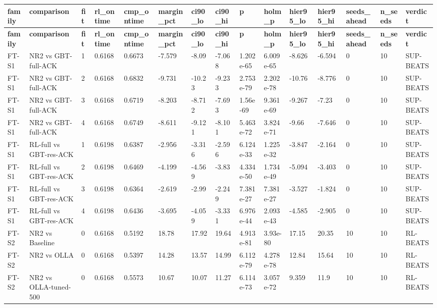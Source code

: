 \documentclass[10pt]{article}
\begin{document}
\begin{landscape}
\begin{longtable}{@{}lllllllllllllll@{}}
\toprule
\textbf{family} & \textbf{comparison} & \textbf{fit} & \textbf{rl\_ontime} & \textbf{cmp\_ontime} & \textbf{margin\_pct} & \textbf{ci90\_lo} & \textbf{ci90\_hi} & \textbf{p} & \textbf{holm\_p} & \textbf{hier95\_lo} & \textbf{hier95\_hi} & \textbf{seeds\_ahead} & \textbf{n\_seeds} & \textbf{verdict} \\
\midrule
\endfirsthead
\toprule
\textbf{family} & \textbf{comparison} & \textbf{fit} & \textbf{rl\_ontime} & \textbf{cmp\_ontime} & \textbf{margin\_pct} & \textbf{ci90\_lo} & \textbf{ci90\_hi} & \textbf{p} & \textbf{holm\_p} & \textbf{hier95\_lo} & \textbf{hier95\_hi} & \textbf{seeds\_ahead} & \textbf{n\_seeds} & \textbf{verdict} \\
\midrule
\endhead
FT-S1 & NR2 vs GBT-full-ACK & 1 & 0.6168 & 0.6673 & -7.579 & -8.09 & -7.068 & 1.202e-65 & 6.009e-65 & -8.626 & -6.594 & 0 & 10 & SUP-BEATS \\
FT-S1 & NR2 vs GBT-full-ACK & 2 & 0.6168 & 0.6832 & -9.731 & -10.23 & -9.233 & 2.753e-79 & 2.202e-78 & -10.76 & -8.776 & 0 & 10 & SUP-BEATS \\
FT-S1 & NR2 vs GBT-full-ACK & 3 & 0.6168 & 0.6719 & -8.203 & -8.712 & -7.693 & 1.56e-69 & 9.361e-69 & -9.267 & -7.23 & 0 & 10 & SUP-BEATS \\
FT-S1 & NR2 vs GBT-full-ACK & 4 & 0.6168 & 0.6749 & -8.611 & -9.121 & -8.101 & 5.463e-72 & 3.824e-71 & -9.66 & -7.646 & 0 & 10 & SUP-BEATS \\
FT-S1 & RL-full vs GBT-res-ACK & 1 & 0.6198 & 0.6387 & -2.956 & -3.316 & -2.596 & 6.124e-33 & 1.225e-32 & -3.847 & -2.164 & 0 & 10 & SUP-BEATS \\
FT-S1 & RL-full vs GBT-res-ACK & 2 & 0.6198 & 0.6469 & -4.199 & -4.569 & -3.83 & 4.334e-50 & 1.734e-49 & -5.094 & -3.403 & 0 & 10 & SUP-BEATS \\
FT-S1 & RL-full vs GBT-res-ACK & 3 & 0.6198 & 0.6364 & -2.619 & -2.99 & -2.249 & 7.381e-27 & 7.381e-27 & -3.527 & -1.824 & 0 & 10 & SUP-BEATS \\
FT-S1 & RL-full vs GBT-res-ACK & 4 & 0.6198 & 0.6436 & -3.695 & -4.059 & -3.331 & 6.976e-44 & 2.093e-43 & -4.585 & -2.905 & 0 & 10 & SUP-BEATS \\
FT-S2 & NR2 vs Baseline & 0 & 0.6168 & 0.5192 & 18.78 & 17.92 & 19.64 & 4.913e-81 & 3.93e-80 & 17.15 & 20.35 & 10 & 10 & RL-BEATS \\
FT-S2 & NR2 vs OLLA & 0 & 0.6168 & 0.5397 & 14.28 & 13.57 & 14.99 & 6.112e-79 & 4.278e-78 & 12.84 & 15.64 & 10 & 10 & RL-BEATS \\
FT-S2 & NR2 vs OLLA-tuned-500 & 0 & 0.6168 & 0.5573 & 10.67 & 10.07 & 11.27 & 6.114e-73 & 3.057e-72 & 9.359 & 11.9 & 10 & 10 & RL-BEATS \\

\end{longtable}
\end{landscape}
\end{document}
